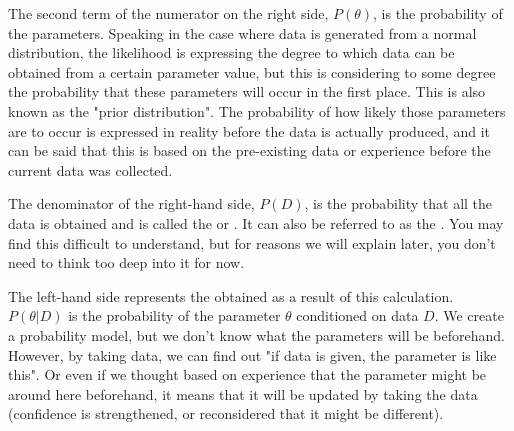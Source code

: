\documentclass{ltjsbook}
\begin{document}
The second term of the numerator on the right side, $P(\theta)$, is the probability of the parameters. Speaking in the case where data is generated from a normal distribution, the likelihood is expressing the degree to which data can be obtained from a certain parameter value, but this is considering to some degree the probability that these parameters will occur in the first place. This is also known as the "prior distribution". The probability of how likely those parameters are to occur is expressed in reality before the data is actually produced, and it can be said that this is based on the pre-existing data or experience before the current data was collected.

The denominator of the right-hand side, $P(D)$, is the probability that all the data is obtained and is called the  or . It can also be referred to as the . You may find this difficult to understand, but for reasons we will explain later, you don't need to think too deep into it for now.

The left-hand side represents the  obtained as a result of this calculation. $P(\theta|D)$ is the probability of the parameter $\theta$ conditioned on data $D$. We create a probability model, but we don't know what the parameters will be beforehand. However, by taking data, we can find out "if data is given, the parameter is like this". Or even if we thought based on experience that the parameter might be around here beforehand, it means that it will be updated by taking the data (confidence is strengthened, or reconsidered that it might be different).
\end{document}
